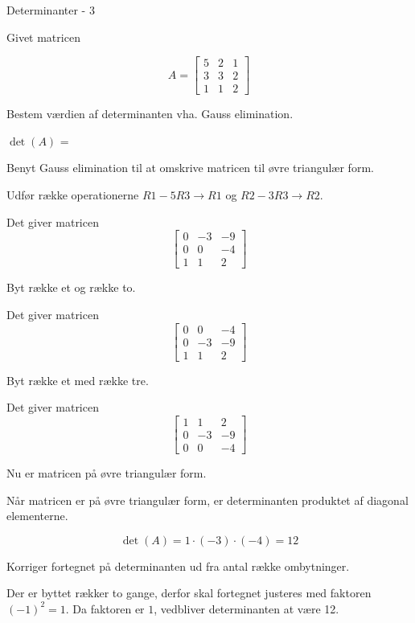\documentclass{article}
\begin{document}
\begin{exercise}{Determinanter - 3}

Givet matricen

\[
A = \left[\begin{array}{rrr}
5 & 2 & 1 \\
3 & 3 & 2 \\
1 & 1 & 2
\end{array} \right]
\]

Bestem værdien af determinanten vha. Gauss elimination.

$\det(A)$ = 

\hint
Benyt Gauss elimination til at omskrive matricen til
øvre triangulær form.

\hint
Udfør række operationerne
$R1 - 5 R3 \to R1$ og
$R2 - 3 R3 \to R2$.

\hint
Det giver matricen
\[
\left[\begin{array}{rrr}
0 & -3 & -9 \\
0 & 0 & -4 \\
1 & 1 & 2
\end{array} \right]
\]

\hint
Byt række et og række to.

\hint
Det giver matricen
\[
\left[\begin{array}{rrr}
0 & 0 & -4 \\
0 & -3 & -9 \\
1 & 1 & 2
\end{array} \right]
\]

\hint
Byt række et med række tre.

\hint
Det giver matricen
\[
\left[\begin{array}{rrr}
1 & 1 & 2 \\
0 & -3 & -9 \\
0 & 0 & -4
\end{array} \right]
\]

\hint
Nu er matricen på øvre triangulær form.

\hint
Når matricen er på øvre triangulær form, er determinanten
produktet af diagonal elementerne.

\hint
\[
\det(A) = 1 \cdot (-3) \cdot (-4) = 12
\]

\hint
Korriger fortegnet på determinanten ud fra antal række ombytninger.

\hint
Der er byttet rækker to gange, derfor skal fortegnet justeres med
faktoren $(-1)^2 = 1$.
Da faktoren er $1$, vedbliver determinanten at være 12.

\end{exercise}
\end{document}
